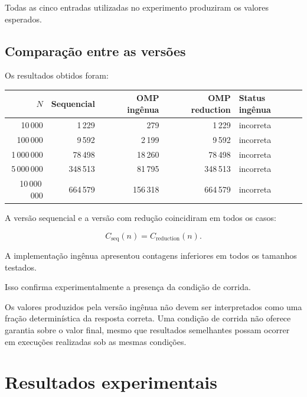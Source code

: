 Todas as cinco entradas utilizadas no experimento produziram os valores
esperados.


\subsection{Comparação entre as versões}

Os resultados obtidos foram:

\begin{center}
\small
\begin{tabular}{|r|r|r|r|l|}
\hline
\textbf{\(N\)} &
\textbf{Sequencial} &
\textbf{OMP ingênua} &
\textbf{OMP reduction} &
\textbf{Status ingênua} \\
\hline
10\,000
& 1\,229
& 279
& 1\,229
& incorreta \\
\hline

100\,000
& 9\,592
& 2\,199
& 9\,592
& incorreta \\
\hline

1\,000\,000
& 78\,498
& 18\,260
& 78\,498
& incorreta \\
\hline

5\,000\,000
& 348\,513
& 81\,795
& 348\,513
& incorreta \\
\hline

10\,000\,000
& 664\,579
& 156\,318
& 664\,579
& incorreta \\
\hline
\end{tabular}
\end{center}

A versão sequencial e a versão com redução coincidiram em todos os casos:

\[
C_{\mathrm{seq}}(n)
=
C_{\mathrm{reduction}}(n).
\]

A implementação ingênua apresentou contagens inferiores em todos os
tamanhos testados.

Isso confirma experimentalmente a presença da condição de corrida.

Os valores produzidos pela versão ingênua não devem ser interpretados como
uma fração determinística da resposta correta. Uma condição de corrida não
oferece garantia sobre o valor final, mesmo que resultados semelhantes
possam ocorrer em execuções realizadas sob as mesmas condições.


\section{Resultados experimentais}
\label{sec:atvd05-resultados}

